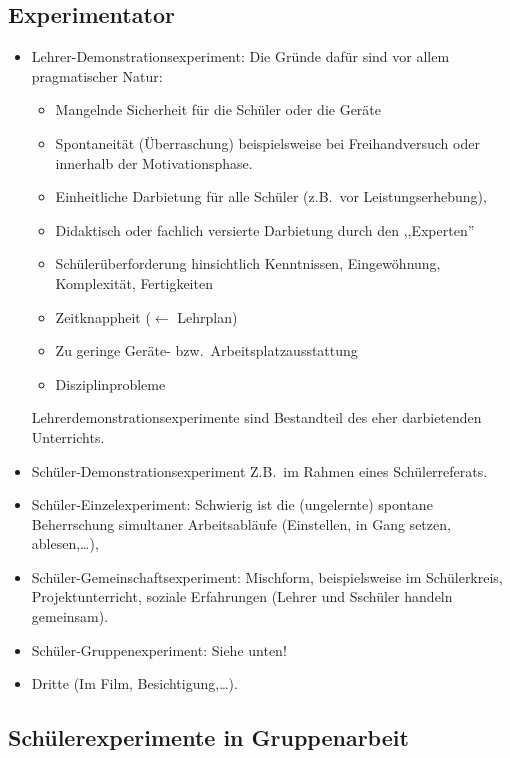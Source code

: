 \subsection{Experimentator}
\begin{itemize}
	\item
	Lehrer-Demonstrationsexperiment:
	Die Gr\"{u}nde daf\"{u}r sind vor allem pragmatischer Natur:
	
	\begin{itemize}
		\item Mangelnde Sicherheit f\"{u}r die Sch\"{u}ler oder die Ger\"{a}te
		\item Spontaneit\"{a}t (\"{U}berraschung) beispielsweise bei Freihandversuch oder innerhalb der
		Motivationsphase.
		\item Einheitliche Darbietung f\"{u}r alle Sch\"{u}ler
		(z.B.\ vor Leistungserhebung),
		\item Didaktisch oder fachlich versierte Darbietung durch den ,,Experten''
		\item Sch\"{u}ler\"{u}berforderung  hinsichtlich Kenntnissen, Eingew\"{o}hnung,
		Komplexit\"{a}t, Fertigkeiten
		\item Zeitknappheit ($\gets$ Lehrplan)
		\item Zu geringe Ger\"{a}te- bzw.\ Arbeitsplatzausstattung
		\item Disziplinprobleme
	\end{itemize}

	Lehrerdemonstrationsexperimente sind Bestandteil des eher
	darbietenden Unterrichts.
	
	\item
	Sch\"{u}ler-Demonstrationsexperiment
	Z.B.\ im Rahmen eines Sch\"{u}lerreferats.
	
	\item
	Sch\"{u}ler-Einzelexperiment:
	Schwierig ist die (ungelernte) spontane Beherrschung simultaner
	Arbeitsabl\"{a}ufe (Einstellen, in Gang setzen, ablesen,\dots),
	\item
	Sch\"{u}ler-Gemeinschaftsexperiment:
	Mischform, beispielsweise im Sch\"{u}lerkreis, Projektunterricht,
	soziale Erfahrungen (Lehrer und Ssch\"{u}ler handeln gemeinsam).
	\item
	Sch\"{u}ler-Gruppenexperiment: Siehe unten!
	\item
	Dritte (Im Film, Besichtigung,\dots).
\end{itemize}

\subsection{Sch\"{u}lerexperimente in Gruppenarbeit}

